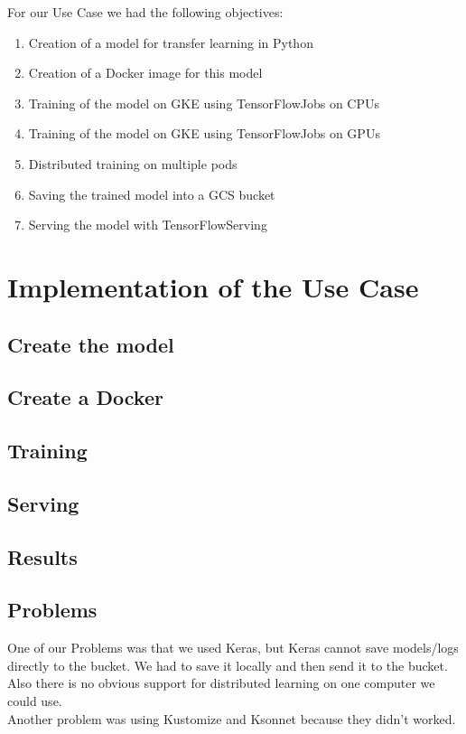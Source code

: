 \documentclass[12pt,a4paper]{scrartcl}		%
\begin{document}
\noindent For our Use Case we had the following objectives:
\begin{enumerate}
\item Creation of a model for transfer learning in Python
\item Creation of a Docker image for this model
\item Training of the model on GKE using TensorFlowJobs on CPUs
\item Training of the model on GKE using TensorFlowJobs on GPUs
\item Distributed training on multiple pods
\item Saving the trained model into a GCS bucket
\item Serving the model with TensorFlowServing
\end{enumerate}


\section{Implementation of the Use Case}



\subsection{Create the model}

\subsection{Create a Docker}

\subsection{Training}

\subsection{Serving}

\subsection{Results}

\subsection{Problems}

\noindent One of our Problems was that we used Keras, but Keras cannot save models/logs directly to the bucket. We had to save it locally and then send it to the bucket. \\
Also there is no obvious support for distributed learning on one computer we could use. \\
Another problem was using Kustomize and Ksonnet because they didn't worked.
\end{document}
